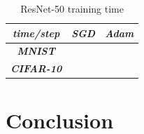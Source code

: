 \documentclass[conference]{IEEEtran}
\begin{document}
\begin{table}[htbp]
    \caption{ResNet-50 training time}
    \begin{center}
    \begin{tabular}{|c|c|c|}
    \cline{1-3} 
    \textit{time/step} & \textbf{\textit{SGD}}& \textbf{\textit{Adam}} \\
    \hline
    \textbf{\textit{MNIST}} &  &  \\
    \hline
    \textbf{\textit{CIFAR-10}} &  &  \\
    \cline{1-3} 
    \end{tabular}
    \label{tab: ResNet-50 training time}
    \end{center}
\end{table}

\section{Conclusion}

\printbibliography
\end{document}
